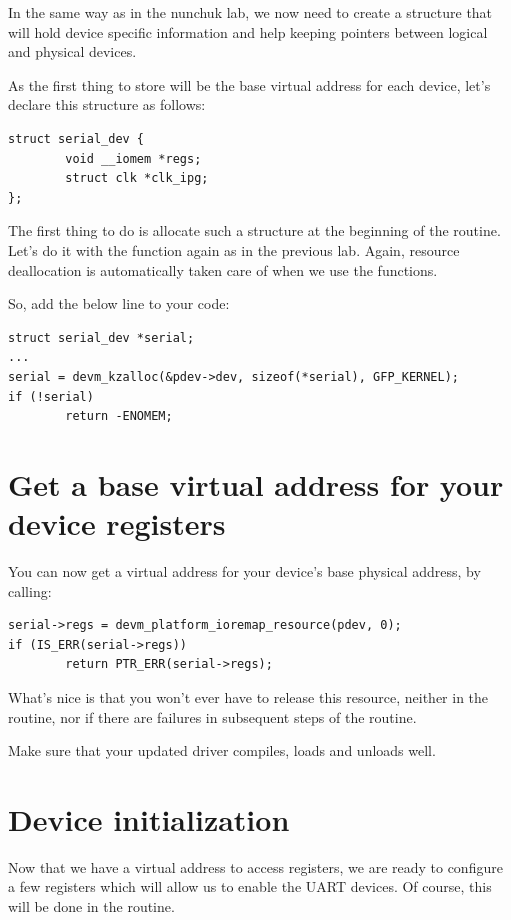 In the same way as in the nunchuk lab, we now need to create a
structure that will hold device specific information and help
keeping pointers between logical and physical devices.

As the first thing to store will be the base virtual address for
each device, let's declare this structure as follows:

\begin{verbatim}
struct serial_dev {
        void __iomem *regs;
        struct clk *clk_ipg;
};
\end{verbatim}

The first thing to do is allocate such a structure at the beginning
of the  routine. Let's do it with the 
function again as in the previous lab. Again, resource deallocation is
automatically taken care of when we use the  functions.

So, add the below line to your code:

\begin{verbatim}
struct serial_dev *serial;
...
serial = devm_kzalloc(&pdev->dev, sizeof(*serial), GFP_KERNEL);
if (!serial)
        return -ENOMEM;
\end{verbatim}

\section{Get a base virtual address for your device registers}

You can now get a virtual address for your device's base physical
address, by calling:

\begin{verbatim}
serial->regs = devm_platform_ioremap_resource(pdev, 0);
if (IS_ERR(serial->regs))
        return PTR_ERR(serial->regs);
\end{verbatim}

What's nice is that you won't ever have to release this resource,
neither in the  routine, nor if there are failures
in subsequent steps of the  routine.

Make sure that your updated driver compiles, loads and unloads well.

\section{Device initialization}

Now that we have a virtual address to access registers, we are ready to
configure a few registers which will allow us to enable the UART
devices. Of course, this will be done in the  routine.

